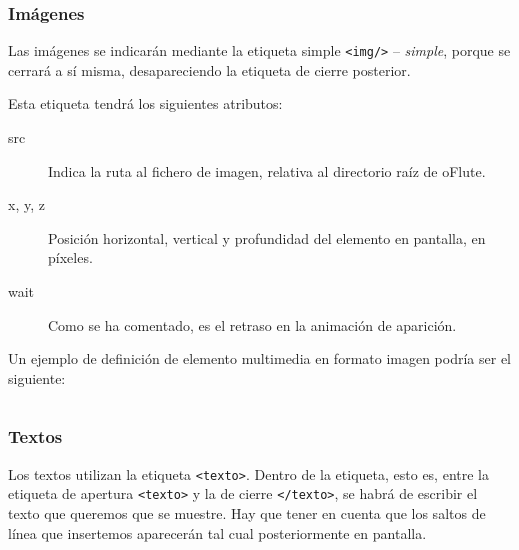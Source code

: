 \subsubsection{Imágenes}
Las imágenes se indicarán mediante la etiqueta simple \texttt{<img/>} --
\textit{simple}, porque se cerrará a sí misma, desapareciendo la etiqueta de
cierre posterior.

Esta etiqueta tendrá los siguientes atributos:
\begin{description}
\item[src] Indica la ruta al fichero de imagen, relativa al directorio raíz de
  oFlute.
\item[x, y, z] Posición horizontal, vertical y profundidad del elemento en
  pantalla, en píxeles.
\item[wait] Como se ha comentado, es el retraso en la animación de aparición.
\end{description}

Un ejemplo de definición de elemento multimedia en formato imagen podría ser el
siguiente:

\inputminted{xml}{apendice_manual_lecciones/snippet_4}

\subsubsection{Textos}
Los textos utilizan la etiqueta \texttt{<texto>}. Dentro de la etiqueta, esto
es, entre la etiqueta de apertura \texttt{<texto>} y la de cierre
\texttt{</texto>}, se habrá de escribir el texto que queremos que se
muestre. Hay que tener en cuenta que los saltos de línea que insertemos
aparecerán tal cual posteriormente en pantalla.


